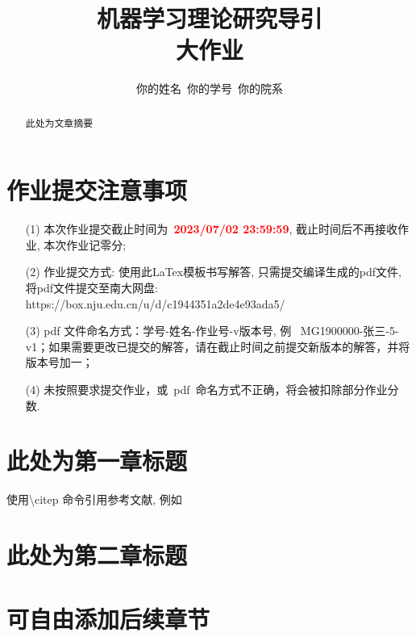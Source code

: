 \documentclass[a4paper,UTF8]{article}
\numberwithin{equation}{section}
\begin{document}
\title{机器学习理论研究导引\\
大作业}
\author{你的姓名\, 你的学号\, 你的院系} 
\date{}
\maketitle

\section*{作业提交注意事项}
\begin{tcolorbox}
  \begin{enumerate}
      \item[(1)] 本次作业提交截止时间为~\textcolor{red}{\textbf{2023/07/02  23:59:59}}, 截止时间后不再接收作业, 本次作业记零分; 
      \item[(2)] 作业提交方式: 使用此LaTex模板书写解答, 只需提交编译生成的pdf文件, 将pdf文件提交至南大网盘:
      \newline https://box.nju.edu.cn/u/d/c1944351a2de4e93ada5/
      \item[(3)] pdf 文件命名方式：学号-姓名-作业号-v版本号, 例~ MG1900000-张三-5-v1；如果需要更改已提交的解答，请在截止时间之前提交新版本的解答，并将版本号加一；
      \item[(4)] 未按照要求提交作业，或~pdf~命名方式不正确，将会被扣除部分作业分数. 
  \end{enumerate}
\end{tcolorbox}

\begin{abstract}

此处为文章摘要

\end{abstract}


\newpage
\section{此处为第一章标题}
使用\textbackslash{}citep 命令引用参考文献,  例如\citep{book/mohri2018foundations} \citep{journal/Vapnik1971} \citep{conf/Sugiyama2006local}

\section{此处为第二章标题}

\section{可自由添加后续章节}



\end{document}

